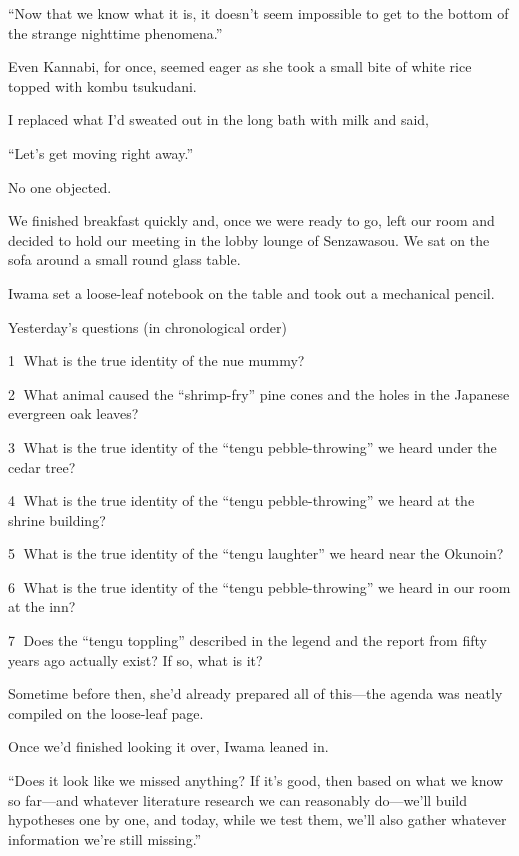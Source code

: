 \documentclass[
    a4paper,
    12pt,
    twoside,
    openany,
    UTF8,
    fontset=windows
]{ctexbook}
\begin{document}
``Now that we know what it is, it doesn't seem impossible to get to the bottom of the strange nighttime phenomena.''

Even Kannabi, for once, seemed eager as she took a small bite of white rice topped with kombu tsukudani.

I replaced what I'd sweated out in the long bath with milk and said,

``Let's get moving right away.''

No one objected.

We finished breakfast quickly and, once we were ready to go, left our room and decided to hold our meeting in the lobby lounge of Senzawasou.
We sat on the sofa around a small round glass table.

Iwama set a loose-leaf notebook on the table and took out a mechanical pencil.

{\bfseries

Yesterday's questions (in chronological order)

\textcircled{1} What is the true identity of the nue mummy?

\textcircled{2} What animal caused the ``shrimp-fry'' pine cones and the holes in the Japanese evergreen oak leaves?

\textcircled{3} What is the true identity of the ``tengu pebble-throwing'' we heard under the cedar tree?

\textcircled{4} What is the true identity of the ``tengu pebble-throwing'' we heard at the shrine building?

\textcircled{5} What is the true identity of the ``tengu laughter'' we heard near the Okunoin?

\textcircled{6} What is the true identity of the ``tengu pebble-throwing'' we heard in our room at the inn?

\textcircled{7} Does the ``tengu toppling'' described in the legend and the report from fifty years ago actually exist? If so, what is it?
}

Sometime before then, she'd already prepared all of this---the agenda was neatly compiled on the loose-leaf page.

Once we'd finished looking it over, Iwama leaned in.

``Does it look like we missed anything? If it's good, then based on what we know so far---and whatever literature research we can reasonably do---we'll build hypotheses one by one, and today, while we test them, we'll also gather whatever information we're still missing.''
\end{document}

